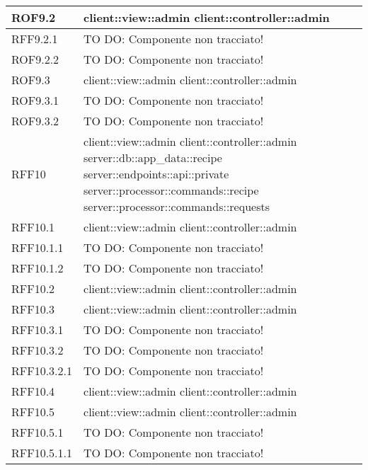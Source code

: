 \begin{center}
\begin{longtable}{| p{4cm} | p{8cm} |}
\hline
ROF9.2 & client::view::admin \newline client::controller::admin \\
\hline
RFF9.2.1 & TO DO: Componente non tracciato! \\
\hline
ROF9.2.2 & TO DO: Componente non tracciato! \\
\hline
ROF9.3 & client::view::admin \newline client::controller::admin \\
\hline
ROF9.3.1 & TO DO: Componente non tracciato! \\
\hline
ROF9.3.2 & TO DO: Componente non tracciato! \\
\hline
RFF10 & client::view::admin \newline client::controller::admin \newline server::db::app\_data::recipe \newline server::endpoints::api::private \newline server::processor::commands::recipe \newline server::processor::commands::requests \\
\hline
RFF10.1 & client::view::admin \newline client::controller::admin \\
\hline
RFF10.1.1 & TO DO: Componente non tracciato! \\
\hline
RFF10.1.2 & TO DO: Componente non tracciato! \\
\hline
RFF10.2 & client::view::admin \newline client::controller::admin \\
\hline
RFF10.3 & client::view::admin \newline client::controller::admin \\
\hline
RFF10.3.1 & TO DO: Componente non tracciato! \\
\hline
RFF10.3.2 & TO DO: Componente non tracciato! \\
\hline
RFF10.3.2.1 & TO DO: Componente non tracciato! \\
\hline
RFF10.4 & client::view::admin \newline client::controller::admin \\
\hline
RFF10.5 & client::view::admin \newline client::controller::admin \\
\hline
RFF10.5.1 & TO DO: Componente non tracciato! \\
\hline
RFF10.5.1.1 & TO DO: Componente non tracciato! \\

\end{longtable}
\end{center}
